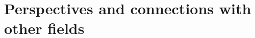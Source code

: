 





















\section{Perspectives and connections with other fields}\label{sec:concl:perspectives}




